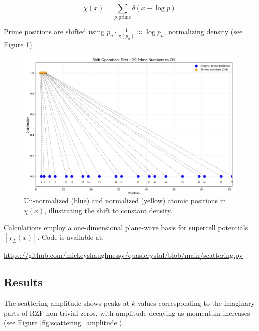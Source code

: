 \documentclass[11pt, oneside]{article}
\begin{document}
\begin{equation}
\chi(x) = \sum_{p \text{ prime}} \delta(x - \log p)
\end{equation}

Prime positions are shifted using $p_n \cdot \frac{1}{\pi(p_n)} \approx \log p_n$, normalizing density (see Figure \ref{fig:normalized_positions}).

\begin{figure}[htbp]
\centering
\includegraphics[width=0.8\linewidth]{normalizing.png}
\caption{Un-normalized (blue) and normalized (yellow) atomic positions in $\chi(x)$, illustrating the shift to constant density.}
\label{fig:normalized_positions}
\end{figure}

Calculations employ a one-dimensional plane-wave basis for supercell potentials $[\chi_L(x)]$. Code is available at:

\url{https://github.com/mickeyshaughnessy/quasicrystal/blob/main/scattering.py}

\subsection{Results}

The scattering amplitude shows peaks at $k$ values corresponding to the imaginary parts of RZF non-trivial zeros, with amplitude decaying as momentum increases (see Figure \ref{fig:scattering_amplitude}).
\end{document}
